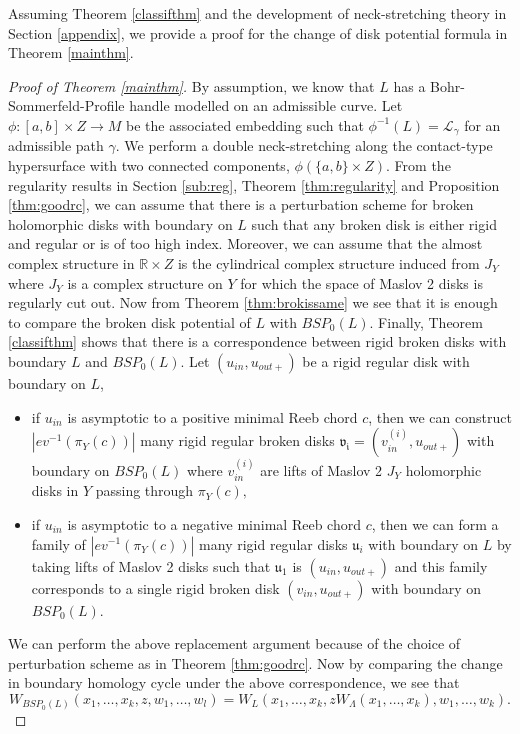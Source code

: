 \documentclass[11pt, oneside,dvipsnames]{amsart}
\renewcommand{\to}{\rightarrow}
\newcommand{\inv}{^{-1}}
\renewcommand{\to}{\rightarrow}
\newcommand{\<}{\langle}
\renewcommand{\>}{\rangle}
\newcommand{\inn}{{in}}
\newcommand{\outp}{{out+}}
\newcommand{\bR}{\mathbb{R}}
\newcommand{\cL}{\mathcal{L}}
\renewcommand{\to}{\rightarrow}
\theoremstyle{definition}
\theoremstyle{definition}
\numberwithin{equation}{subsection}
\begin{document}
Assuming Theorem \ref{classifthm} and the development of neck-stretching theory in Section \ref{appendix}, we provide a proof for the change of disk potential formula in Theorem \ref{mainthm}.

\begin{proof}[Proof of Theorem \ref{mainthm}]
    By assumption, we know that $L$ has a Bohr-Sommerfeld-Profile handle modelled on an admissible curve. Let $\phi: [a,b] \times Z \to M$ be the associated embedding such that $\phi\inv(L) = \cL_\gamma$ for an admissible path $\gamma.$ We perform a double neck-stretching along the contact-type hypersurface with two connected components, $\phi (\{ a,b\} \times Z)$. From the regularity results in Section \ref{sub:reg},  Theorem \ref{thm:regularity} and Proposition \ref{thm:goodrc},  we can assume that there is a perturbation scheme for broken holomorphic disks with boundary on $L$ such that any broken disk is either rigid and regular or is of too high index. Moreover, we can assume that the almost complex structure in $\bR \times Z$ is the cylindrical complex structure induced from $J_Y$ where $J_Y$ is a complex structure on $Y$ for which the space of Maslov 2 disks is regularly cut out. Now from Theorem \ref{thm:brokissame} we see that it is enough to compare the broken disk potential of $L$ with $BSP_0(L)$. Finally, Theorem \ref{classifthm} shows that there is a correspondence between rigid broken disks with boundary $L$ and $BSP_0(L)$. Let $( u_\inn,u_\outp)$ be a rigid regular disk with boundary on $L$,
    \begin{itemize}
        \item if $u_\inn$ is asymptotic to a positive minimal Reeb chord $c$, then we can construct $|ev\inv ( \pi_Y (c))|$ many rigid regular broken disks $\mathfrak{v_i}= (v^{(i)}_\inn, u_\outp)$ with boundary on $BSP_0(L)$ where $v^{(i)}_\inn$ are lifts of Maslov 2 $J_Y$ holomorphic disks in $Y$ passing through $\pi_Y (c),$
        \item if $u_\inn$ is asymptotic to a negative minimal Reeb chord $c$, then
        we can form a family of $|ev\inv(\pi_Y(c))|$ many rigid regular disks $\mathfrak{u}_i$ with boundary on $L$ by taking lifts of Maslov 2 disks such that $\mathfrak{u}_1$ is $(u_\inn, u_\outp)$ and this family corresponds to a single rigid broken disk $(v_\inn, u_\outp)$ with boundary on $BSP_0(L).$
    \end{itemize}
We can perform the above replacement argument because of the choice of perturbation scheme as in Theorem \ref{thm:goodrc}. Now by comparing the change in boundary homology cycle under the above correspondence, we see that 
$$  W_{BSP_0(L)}(x_1,\dots,x_k,z,w_1,\dots,w_l)
 =W_L(x_1,\dots,x_k,zW_{\Lambda}(x_1,\dots,x_k),w_1,\dots,w_k).  $$
    
\end{proof}
\end{document}
